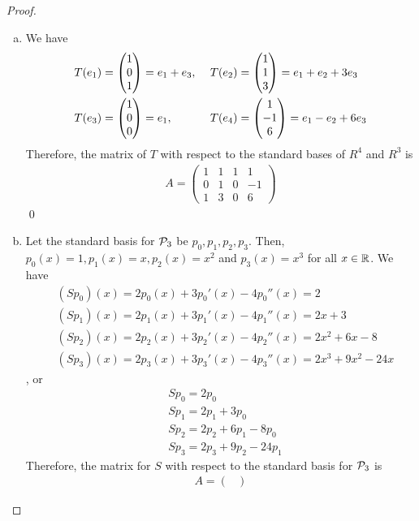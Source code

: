 \begin{proof}
    \renewcommand{\qedsymbol}{$\blacksquare$}
    \begin{enumerate}[(a)]
        \item We have 
        \[
            \begin{aligned}
                T(e_1) &= \ColVecThree{1}{0}{1}=e_1+e_3,\
                &&T(e_2) = \ColVecThree{1}{1}{3}=e_1+e_2+3e_3\\
                T(e_3) &= \ColVecThree{1}{0}{0}=e_1,\
                &&T(e_4) = \ColVecThree{1}{-1}{6}=e_1-e_2+6e_3
            \end{aligned}
        \]
        Therefore, the matrix of $T$ with respect to the standard bases of $R^4$ and $R^3$ is 
        \[
            \begin{aligned}
                A=\begin{pmatrix}
                    1 & 1 & 1 & 1\\
                    0 & 1 & 0 & -1\\
                    1 & 3 & 0 & 6
                \end{pmatrix}
            \end{aligned}
        \]\qed
        \item Let the standard basis for $\P_3$ be $p_0,p_1,p_2,p_3$.
        Then, $p_0(x)=1,p_1(x)=x,p_2(x)=x^2$ and $p_3(x)=x^3$ for all $x\in\R$.
        We have
        \[
            \begin{aligned}
                &(Sp_0)(x)=2p_0(x)+3p_0'(x)-4p_0''(x)=2\\
                &(Sp_1)(x)=2p_1(x)+3p_1'(x)-4p_1''(x)=2x+3\\
                &(Sp_2)(x)=2p_2(x)+3p_2'(x)-4p_2''(x)=2x^2+6x-8\\
                &(Sp_3)(x)=2p_3(x)+3p_3'(x)-4p_3''(x)=2x^3+9x^2-24x
            \end{aligned}
        \]
        , or 
        \[
            \begin{aligned}
                &Sp_0=2p_0\\
                &Sp_1=2p_1+3p_0\\
                &Sp_2=2p_2+6p_1-8p_0\\
                &Sp_3=2p_3+9p_2-24p_1
            \end{aligned}
        \]
        Therefore, the matrix for $S$ with respect to the standard basis for $\P_3$ is 
        \[
            \begin{aligned}
                A=\begin{pmatrix}

\end{pmatrix}
\end{aligned}\]
\end{enumerate}
\end{proof}

